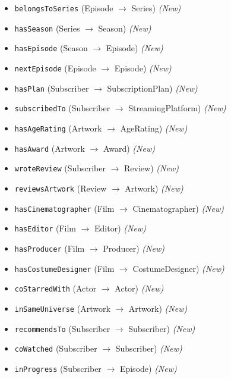 \begin{itemize}
    \item \texttt{belongsToSeries} (Episode $\rightarrow$ Series) \textit{(New)}
    \item \texttt{hasSeason} (Series $\rightarrow$ Season) \textit{(New)}
    \item \texttt{hasEpisode} (Season $\rightarrow$ Episode) \textit{(New)}
    \item \texttt{nextEpisode} (Episode $\rightarrow$ Episode) \textit{(New)}
    \item \texttt{hasPlan} (Subscriber $\rightarrow$ SubscriptionPlan) \textit{(New)}
    \item \texttt{subscribedTo} (Subscriber $\rightarrow$ StreamingPlatform) \textit{(New)}
    \item \texttt{hasAgeRating} (Artwork $\rightarrow$ AgeRating) \textit{(New)}
    \item \texttt{hasAward} (Artwork $\rightarrow$ Award) \textit{(New)}
    \item \texttt{wroteReview} (Subscriber $\rightarrow$ Review) \textit{(New)}
    \item \texttt{reviewsArtwork} (Review $\rightarrow$ Artwork) \textit{(New)}
    \item \texttt{hasCinematographer} (Film $\rightarrow$ Cinematographer) \textit{(New)}
    \item \texttt{hasEditor} (Film $\rightarrow$ Editor) \textit{(New)}
    \item \texttt{hasProducer} (Film $\rightarrow$ Producer) \textit{(New)}
    \item \texttt{hasCostumeDesigner} (Film $\rightarrow$ CostumeDesigner) \textit{(New)}
    \item \texttt{coStarredWith} (Actor $\rightarrow$ Actor) \textit{(New)}
    \item \texttt{inSameUniverse} (Artwork $\rightarrow$ Artwork) \textit{(New)}
    \item \texttt{recommendsTo} (Subscriber $\rightarrow$ Subscriber) \textit{(New)}
    \item \texttt{coWatched} (Subscriber $\rightarrow$ Subscriber) \textit{(New)}
    \item \texttt{inProgress} (Subscriber $\rightarrow$ Episode) \textit{(New)}
\end{itemize}

